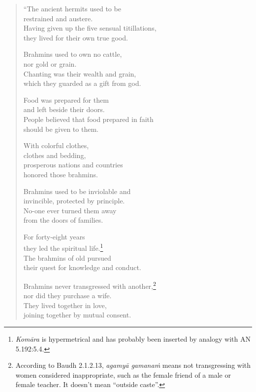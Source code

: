 \documentclass[12pt,openany]{book}%
\begin{document}
\begin{verse}%
“The ancient hermits used to be \\
restrained and austere. \\
Having given up the five sensual titillations, \\
they lived for their own true good. 

Brahmins used to own no cattle, \\
nor gold or grain. \\
Chanting was their wealth and grain, \\
which they guarded as a gift from god. 

Food was prepared for them \\
and left beside their doors. \\
People believed that food prepared in faith \\
should be given to them. 

With colorful clothes, \\
clothes and bedding, \\
prosperous nations and countries \\
honored those brahmins. 

Brahmins used to be inviolable and \\
invincible, protected by principle. \\
No-one ever turned them away \\
from the doors of families. 

For forty-eight years \\
they led the spiritual life.\footnote{\textit{\textsanskrit{Komāra}} is hypermetrical and has probably been inserted by analogy with AN 5.192:5.4. } \\
The brahmins of old pursued \\
their quest for knowledge and conduct. 

Brahmins never transgressed with another,\footnote{According to Baudh 2.1.2.13, \textit{\textsanskrit{agamyā} \textsanskrit{gamanaṁ}} means not transgressing with women considered inappropriate, such as the female friend of a male or female teacher. It doesn’t mean “outside caste”. } \\
nor did they purchase a wife. \\
They lived together in love, \\
joining together by mutual consent. 


\end{verse}
\end{document}
